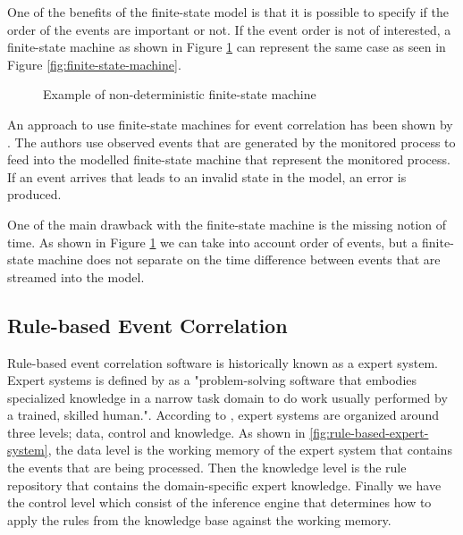 One of the benefits of the finite-state model is that it is possible to specify if the order of the events are important or not. If the event order is not of interested, a finite-state machine as shown in Figure \ref{fig:finite-state-machine-2} can represent the same case as seen in Figure \ref{fig:finite-state-machine}.
\begin{figure}[ht]
\centering
{}
\caption{Example of non-deterministic finite-state machine}
\label{fig:finite-state-machine-2}
\end{figure}

An approach to use finite-state machines for event correlation has been shown by \textcite{Bouloutas_1992}. The authors use observed events that are generated by the monitored process to feed into the modelled finite-state machine that represent the monitored process. If an event arrives that leads to an invalid state in the model, an error is produced.

One of the main drawback with the finite-state machine is the missing notion of time. As shown in Figure \ref{fig:finite-state-machine-2} we can take into account order of events, but a finite-state machine does not separate on the time difference between events that are streamed into the model.

\subsection{Rule-based Event Correlation}
\label{sub:rule-based-event-correlation}
Rule-based event correlation software is historically known as a expert system. Expert systems is defined by \textcite{cronk_1988} as a "problem-solving software that embodies specialized knowledge in a narrow task domain to do work usually performed by a trained, skilled human.". According to \textcite{cronk_1988}, expert systems are organized around three levels; data, control and knowledge. As shown in \cref{fig:rule-based-expert-system}, the data level is the working memory of the expert system that contains the events that are being processed. Then the knowledge level is the rule repository that contains the domain-specific expert knowledge. Finally we have the control level which consist of the inference engine that determines how to apply the rules from the knowledge base against the working memory.

